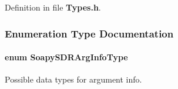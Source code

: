 Definition in file {\bf Types.\+h}.



\subsubsection{Enumeration Type Documentation}
\paragraph[{Soapy\+S\+D\+R\+Arg\+Info\+Type}]{\setlength{\rightskip}{0pt plus 5cm}enum {\bf Soapy\+S\+D\+R\+Arg\+Info\+Type}}\label{Types_8h_a1e35540d68f16b541eedec132d92614d}


Possible data types for argument info. 

